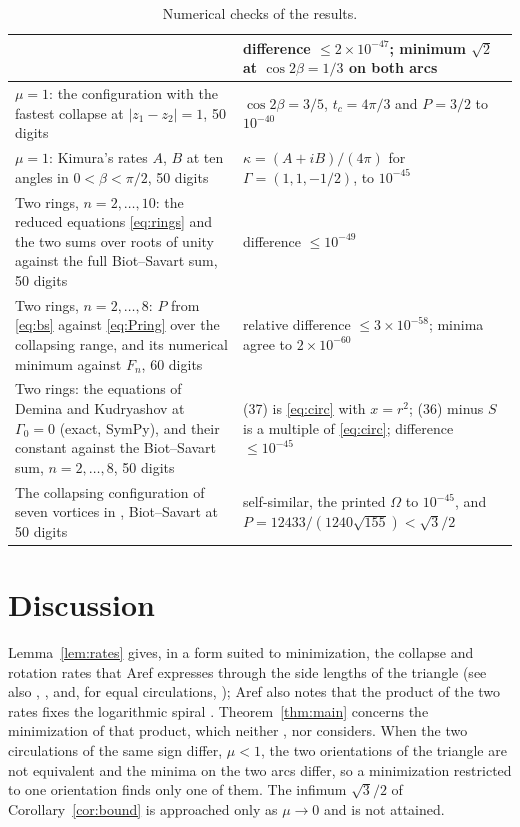 \documentclass[11pt]{article}
\theoremstyle{definition}
\begin{document}
\begin{table}[tp]
\begin{tabular}{|>{\raggedright\arraybackslash}p{}|>{\raggedright\arraybackslash}p{}|}
      & difference $\le 2 \times 10^{-47}$; minimum $\sqrt{2}$ at $\cos 2\beta = 1/3$ on both arcs \\ \hline
    $\mu = 1$: the configuration with the fastest collapse at $|z_1 - z_2| = 1$, 50 digits
      & $\cos 2\beta = 3/5$, $t_c = 4\pi/3$ and $P = 3/2$ to $10^{-40}$ \\ \hline
    $\mu = 1$: Kimura's rates $A$, $B$ \cite[Eq.~(4.4)]{kimura1987} at ten angles in $0 < \beta < \pi/2$, 50 digits
      & $\kappa = (A + iB)/(4\pi)$ for $\Gamma = (1, 1, -1/2)$, to $10^{-45}$ \\ \hline
    Two rings, $n = 2, \dots, 10$: the reduced equations \eqref{eq:rings} and the two sums over roots of unity against the full Biot--Savart sum, 50 digits
      & difference $\le 10^{-49}$ \\ \hline
    Two rings, $n = 2, \dots, 8$: $P$ from \eqref{eq:bs} against \eqref{eq:Pring} over the collapsing range, and its numerical minimum against $F_n$, 60 digits
      & relative difference $\le 3 \times 10^{-58}$; minima agree to $2 \times 10^{-60}$ \\ \hline
    Two rings: the equations of Demina and Kudryashov \cite[Eqs.~(36)--(37)]{dk2014} at $\Gamma_0 = 0$ (exact, SymPy), and their constant against the Biot--Savart sum, $n = 2, \dots, 8$, 50 digits
      & (37) is \eqref{eq:circ} with $x = r^2$; (36) minus $S$ is a multiple of \eqref{eq:circ}; difference $\le 10^{-45}$ \\ \hline
    The collapsing configuration of seven vortices in \cite[Table~1, Fig.~1a]{dk2014}, Biot--Savart at 50 digits
      & self-similar, the printed $\Omega$ to $10^{-45}$, and $P = 12433/(1240\sqrt{155}) < \sqrt{3}/2$ \\ \hline
  \end{tabular}
  \caption{Numerical checks of the results.}
  \label{tab:checks}
\end{table}

\section{Discussion}

Lemma~\ref{lem:rates} gives, in a form suited to minimization, the collapse and rotation rates that Aref \cite[Eqs.~(25a), (25d)]{aref2010} expresses through the side lengths of the triangle (see also \cite{gotoda2021}, \cite[Eq.~(E.1)]{gallay2026}, and, for equal circulations, \cite[Eq.~(4.4)]{kimura1987}); Aref also notes that the product of the two rates fixes the logarithmic spiral \cite[Eq.~(29c)]{aref2010}. Theorem~\ref{thm:main} concerns the minimization of that product, which neither \cite{aref2010}, \cite{cds1980} nor \cite{kimura1987} considers. When the two circulations of the same sign differ, $\mu < 1$, the two orientations of the triangle are not equivalent and the minima on the two arcs differ, so a minimization restricted to one orientation finds only one of them. The infimum $\sqrt{3}/2$ of Corollary~\ref{cor:bound} is approached only as $\mu \to 0$ and is not attained.
\end{document}
